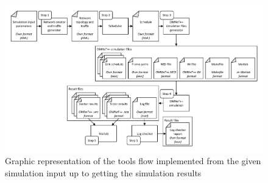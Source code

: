 \documentclass[conference]{IEEEtran}
\begin{document}









\begin{figure}[h]
	\centerline{\includegraphics[keepaspectratio=true, width=16cm] {figures/toolchain-architecture}}
	\caption{Graphic representation of the tools flow implemented from the given simulation input up to getting the simulation results}
	\label{fig:toolchain-architecture}
\end{figure}
\end{document}
